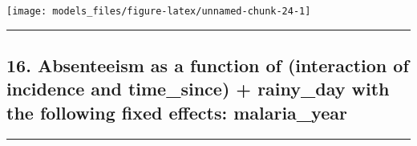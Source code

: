 \documentclass[]{article}
\begin{document}
\begin{center}\texttt{[image: models\_files/figure-latex/unnamed-chunk-24-1]} \end{center}

\newpage

\begin{center}\rule{0.5\linewidth}{\linethickness}\end{center}

\subsection{16. Absenteeism as a function of (interaction of incidence
and time\_since) + rainy\_day with the following fixed effects:
malaria\_year}\label{absenteeism-as-a-function-of-interaction-of-incidence-and-time_since-rainy_day-with-the-following-fixed-effects-malaria_year}

\begin{center}\rule{0.5\linewidth}{\linethickness}\end{center}
\end{document}
